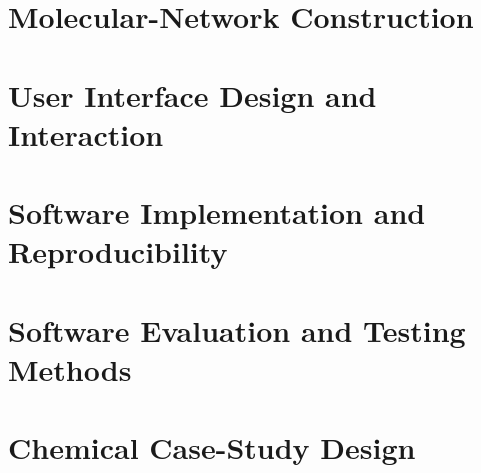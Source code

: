  \section{Molecular-Network Construction}\label{sec:network-construction}

  \section{User Interface Design and Interaction}\label{sec:interface-design}

  \section{Software Implementation and Reproducibility}\label{sec:implementation}

  \section{Software Evaluation and Testing Methods}\label{sec:evaluation-methods}

  \section{Chemical Case-Study Design}\label{sec:case-study-design}
